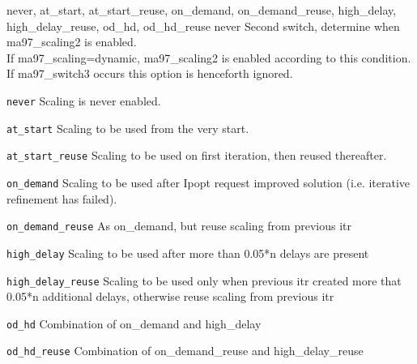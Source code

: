 %
{\ttfamily never, at\_start, at\_start\_reuse, on\_demand, on\_demand\_reuse, high\_delay, high\_delay\_reuse, od\_hd, od\_hd\_reuse}%
{never}%
{Second switch, determine when ma97\_scaling2 is enabled.\\
If ma97\_scaling=dynamic, ma97\_scaling2 is enabled according to this condition. If ma97\_switch3 occurs this option is henceforth ignored.}%
{\begin{list}{}{
\setlength{\parsep}{0em}
\setlength{\leftmargin}{5ex}
\setlength{\labelwidth}{2ex}
\setlength{\itemindent}{0ex}
\setlength{\topsep}{0pt}}
\item[\texttt{never}] Scaling is never enabled.
\item[\texttt{at\_start}] Scaling to be used from the very start.
\item[\texttt{at\_start\_reuse}] Scaling to be used on first iteration, then reused thereafter.
\item[\texttt{on\_demand}] Scaling to be used after Ipopt request improved solution (i.e. iterative refinement has failed).
\item[\texttt{on\_demand\_reuse}] As on\_demand, but reuse scaling from previous itr
\item[\texttt{high\_delay}] Scaling to be used after more than 0.05*n delays are present
\item[\texttt{high\_delay\_reuse}] Scaling to be used only when previous itr created more that 0.05*n additional delays, otherwise reuse scaling from previous itr
\item[\texttt{od\_hd}] Combination of on\_demand and high\_delay
\item[\texttt{od\_hd\_reuse}] Combination of on\_demand\_reuse and high\_delay\_reuse
\end{list}
}

